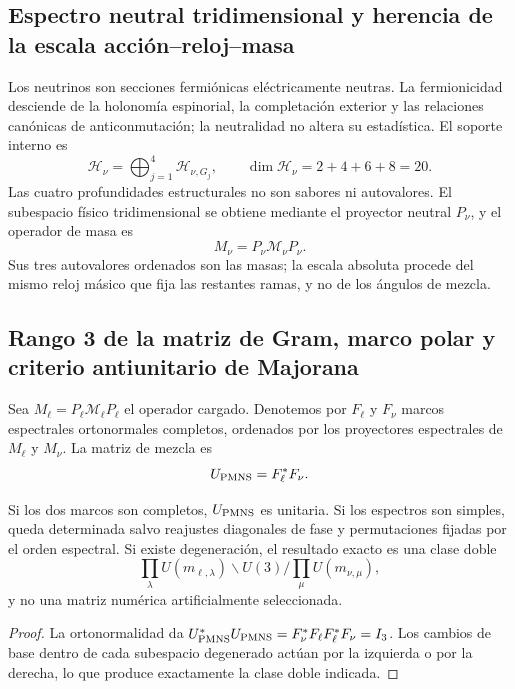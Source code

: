 \subsection{Espectro neutral tridimensional y herencia de la escala acción--reloj--masa}

Los neutrinos son secciones fermiónicas eléctricamente neutras. La
fermionicidad desciende de la holonomía espinorial, la completación exterior y
las relaciones canónicas de anticonmutación; la neutralidad no altera su
estadística. El soporte interno es
\[
 \mathcal H_\nu=
 \bigoplus_{j=1}^{4}\mathcal H_{\nu,G_j},
 \qquad
 \dim\mathcal H_\nu=2+4+6+8=20.
\]
Las cuatro profundidades estructurales no son sabores ni autovalores. El
subespacio físico tridimensional se obtiene mediante el proyector neutral
\(P_\nu\), y el operador de masa es
\[
 M_\nu=P_\nu\mathcal M_\nu P_\nu.
\]
Sus tres autovalores ordenados son las masas; la escala absoluta procede del
mismo reloj másico que fija las restantes ramas, y no de los ángulos de mezcla.

\subsection{Rango 3 de la matriz de Gram, marco polar y criterio antiunitario de Majorana}

Sea \(M_\ell=P_\ell\mathcal M_\ell P_\ell\) el operador cargado. Denotemos por
\(F_\ell\) y \(F_\nu\) marcos espectrales ortonormales completos, ordenados por
los proyectores espectrales de \(M_\ell\) y \(M_\nu\). La matriz de mezcla es
\[
 U_{\rm PMNS}=F_\ell^*F_\nu.
\]

\begin{theorem}
Si los dos marcos son completos, \(U_{\rm PMNS}\) es unitaria. Si los
espectros son simples, queda determinada salvo reajustes diagonales de fase y
permutaciones fijadas por el orden espectral. Si existe degeneración, el
resultado exacto es una clase doble
\[
 \prod_\lambda U(m_{\ell,\lambda})
 \backslash U(3) /
 \prod_\mu U(m_{\nu,\mu}),
\]
y no una matriz numérica artificialmente seleccionada.
\end{theorem}

\begin{proof}
La ortonormalidad da
\(U_{\rm PMNS}^*U_{\rm PMNS}=F_\nu^*F_\ell F_\ell^*F_\nu=I_3\).
Los cambios de base dentro de cada subespacio degenerado actúan por la
izquierda o por la derecha, lo que produce exactamente la clase doble
indicada.
\end{proof}

